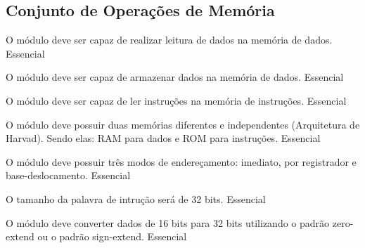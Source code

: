 \subsection{Conjunto de Operações de Memória}

	  \begin{functional}
		{O módulo deve ser capaz de realizar leitura de dados na memória de dados.}
		{Essencial}
		
		{O módulo deve ser capaz de armazenar dados na memória de dados.}
		{Essencial}
		
		{O módulo deve ser capaz de ler instruções na memória de instruções.}
		{Essencial}
        
		 {O módulo deve possuir duas memórias diferentes e independentes (Arquitetura de Harvad). Sendo elas: RAM para dados e ROM para instruções.}
		 {Essencial}
                
        {O módulo deve possuir três modos de endereçamento: imediato, por registrador e base-deslocamento.}
        {Essencial}
         
	  {O tamanho da palavra de intrução será de 32 bits.}
	  {Essencial}

		{O módulo deve converter dados de 16 bits para 32 bits utilizando o padrão zero-extend ou o padrão sign-extend.}
		{Essencial}
		 
	 \end{functional}
